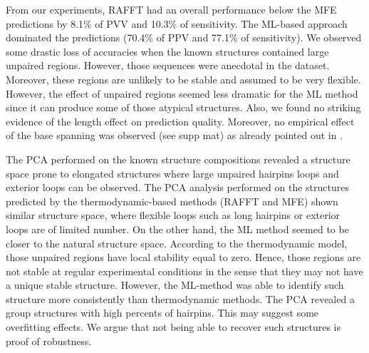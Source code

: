 \documentclass[a4paper,12pt]{article}
\begin{document}
{{From our experiments, RAFFT had an overall performance below the MFE predictions
by 8.1\% of PVV and 10.3\% of sensitivity. The ML-based approach dominated the
predictions (70.4\% of PPV and 77.1\% of sensitivity). We observed some drastic
loss of accuracies when the known structures contained large unpaired regions.
However, those sequences were anecdotal in the dataset. Moreover, these regions
are unlikely to be stable and assumed to be very flexible. However, the effect
of unpaired regions seemed less dramatic for the ML method since it can produce
some of those atypical structures. Also, we found no striking evidence of the
length effect on prediction quality. Moreover, no empirical effect of the base
spanning was observed (see supp mat) as already pointed out in
\cite{amman13_troub_long_range_base_pairs_rna_foldin}.

The PCA performed on the known structure compositions revealed a structure space
prone to elongated structures where large unpaired hairpins loops and exterior
loops can be observed. The PCA analysis performed on the structures predicted by
the thermodynamic-based methods (RAFFT and MFE) shown similar structure space,
where flexible loops such as long hairpins or exterior loops are of limited
number. On the other hand, the ML method seemed to be closer to the natural
structure space. According to the thermodynamic model, those unpaired regions
have local stability equal to zero. Hence, those regions are not stable at
regular experimental conditions in the sense that they may not have a unique
stable structure. However, the ML-method was able to identify such structure
more consistently than thermodynamic methods. The PCA revealed a group
structures with high percents of hairpins. This may suggest some overfitting
effects. We argue that not being able to recover such structures is proof of
robustness.

}}
\end{document}
